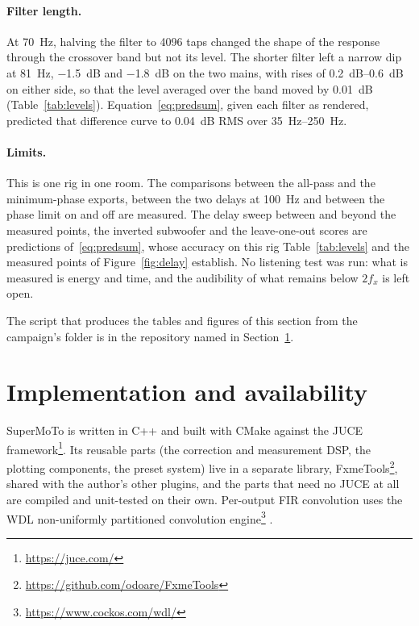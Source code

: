 \documentclass[10pt,a4paper]{article}
\begin{document}
\paragraph{Filter length.} At \SI{70}{\hertz}, halving the filter to 4096 taps changed the shape of the response through the crossover band but not its level. The shorter filter left a narrow dip at \SI{81}{\hertz}, \SI{-1.5}{\dB} and \SI{-1.8}{\dB} on the two mains, with rises of \SIrange{0.2}{0.6}{\dB} on either side, so that the level averaged over the band moved by \SI{0.01}{\dB} (Table~\ref{tab:levels}). Equation~\eqref{eq:predsum}, given each filter as rendered, predicted that difference curve to \SI{0.04}{\dB} RMS over \SIrange{35}{250}{\hertz}.

\paragraph{Limits.} This is one rig in one room. The comparisons between the all-pass and the minimum-phase exports, between the two delays at \SI{100}{\hertz} and between the phase limit on and off are measured. The delay sweep between and beyond the measured points, the inverted subwoofer and the leave-one-out scores are predictions of~\eqref{eq:predsum}, whose accuracy on this rig Table~\ref{tab:levels} and the measured points of Figure~\ref{fig:delay} establish. No listening test was run: what is measured is energy and time, and the audibility of what remains below $2f_x$ is left open.

The script that produces the tables and figures of this section from the campaign's folder is in the repository named in Section~\ref{sec:impl}.

\section{Implementation and availability}\label{sec:impl}


SuperMoTo is written in C++ and built with CMake against the JUCE framework\footnote{\url{https://juce.com/}}. Its reusable parts (the correction and measurement DSP, the plotting components, the preset system) live in a separate library, FxmeTools\footnote{\url{https://github.com/odoare/FxmeTools}}, shared with the author's other plugins, and the parts that need no JUCE at all are compiled and unit-tested on their own. Per-output FIR convolution uses the WDL non-uniformly partitioned convolution engine\footnote{\url{https://www.cockos.com/wdl/}} \cite{Gardner1995}.
\end{document}
